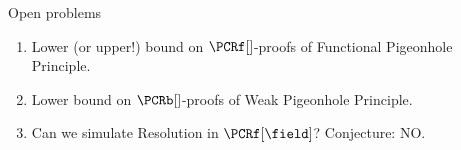 \begin{frame}{Open problems}

    \begin{enumerate}
        \item Lower (or upper!) bound on $\PCRf[]$-proofs of Functional Pigeonhole Principle.
        \item Lower bound on $\PCRb[]$-proofs of Weak Pigeonhole Principle.

            
        \pause
        \item Can we simulate Resolution in $\PCRf[\field]$? \pause Conjecture: NO.
    \end{enumerate}
\end{frame}